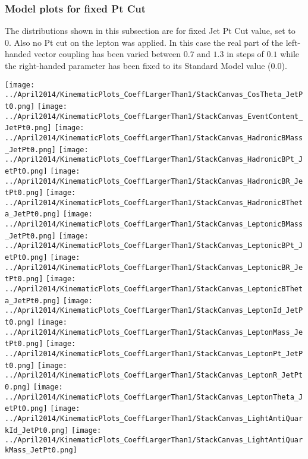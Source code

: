 \documentclass[a4paper,12pt]{report}
\begin{document}
\subsubsection{Model plots for fixed Pt Cut}
The distributions shown in this subsection are for fixed Jet Pt Cut value, set to 0. Also no Pt cut on the lepton was applied. In this case the real part of the left-handed vector coupling has been varied between $0.7$ and $1.3$ in steps of $0.1$ while the right-handed parameter has been fixed to its Standard Model value ($0.0$).
\begin{center}
\texttt{[image: ../April2014/KinematicPlots\_CoeffLargerThan1/StackCanvas\_CosTheta\_JetPt0.png]}
\texttt{[image: ../April2014/KinematicPlots\_CoeffLargerThan1/StackCanvas\_EventContent\_JetPt0.png]}
\texttt{[image: ../April2014/KinematicPlots\_CoeffLargerThan1/StackCanvas\_HadronicBMass\_JetPt0.png]}
\texttt{[image: ../April2014/KinematicPlots\_CoeffLargerThan1/StackCanvas\_HadronicBPt\_JetPt0.png]}
\texttt{[image: ../April2014/KinematicPlots\_CoeffLargerThan1/StackCanvas\_HadronicBR\_JetPt0.png]}
\texttt{[image: ../April2014/KinematicPlots\_CoeffLargerThan1/StackCanvas\_HadronicBTheta\_JetPt0.png]}
\texttt{[image: ../April2014/KinematicPlots\_CoeffLargerThan1/StackCanvas\_LeptonicBMass\_JetPt0.png]}
\texttt{[image: ../April2014/KinematicPlots\_CoeffLargerThan1/StackCanvas\_LeptonicBPt\_JetPt0.png]}
\texttt{[image: ../April2014/KinematicPlots\_CoeffLargerThan1/StackCanvas\_LeptonicBR\_JetPt0.png]}
\texttt{[image: ../April2014/KinematicPlots\_CoeffLargerThan1/StackCanvas\_LeptonicBTheta\_JetPt0.png]}
\texttt{[image: ../April2014/KinematicPlots\_CoeffLargerThan1/StackCanvas\_LeptonId\_JetPt0.png]}
\texttt{[image: ../April2014/KinematicPlots\_CoeffLargerThan1/StackCanvas\_LeptonMass\_JetPt0.png]}
\texttt{[image: ../April2014/KinematicPlots\_CoeffLargerThan1/StackCanvas\_LeptonPt\_JetPt0.png]}
\texttt{[image: ../April2014/KinematicPlots\_CoeffLargerThan1/StackCanvas\_LeptonR\_JetPt0.png]}
\texttt{[image: ../April2014/KinematicPlots\_CoeffLargerThan1/StackCanvas\_LeptonTheta\_JetPt0.png]}
\texttt{[image: ../April2014/KinematicPlots\_CoeffLargerThan1/StackCanvas\_LightAntiQuarkId\_JetPt0.png]}
\texttt{[image: ../April2014/KinematicPlots\_CoeffLargerThan1/StackCanvas\_LightAntiQuarkMass\_JetPt0.png]}

\end{center}
\end{document}
